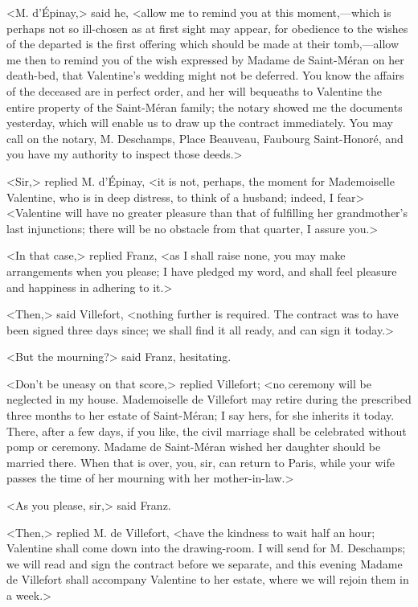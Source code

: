  <M. d'Épinay,> said he, <allow me to remind you at this moment,—which is perhaps not so ill-chosen as at first sight may appear, for obedience to the wishes of the departed is the first offering which should be made at their tomb,—allow me then to remind you of the wish expressed by Madame de Saint-Méran on her death-bed, that Valentine's wedding might not be deferred. You know the affairs of the deceased are in perfect order, and her will bequeaths to Valentine the entire property of the Saint-Méran family; the notary showed me the documents yesterday, which will enable us to draw up the contract immediately. You may call on the notary, M. Deschamps, Place Beauveau, Faubourg Saint-Honoré, and you have my authority to inspect those deeds.> 

 <Sir,> replied M. d'Épinay, <it is not, perhaps, the moment for Mademoiselle Valentine, who is in deep distress, to think of a husband; indeed, I fear\longdash>  <Valentine will have no greater pleasure than that of fulfilling her grandmother's last injunctions; there will be no obstacle from that quarter, I assure you.> 

 <In that case,> replied Franz, <as I shall raise none, you may make arrangements when you please; I have pledged my word, and shall feel pleasure and happiness in adhering to it.> 

 <Then,> said Villefort, <nothing further is required. The contract was to have been signed three days since; we shall find it all ready, and can sign it today.> 

 <But the mourning?> said Franz, hesitating. 

 <Don't be uneasy on that score,> replied Villefort; <no ceremony will be neglected in my house. Mademoiselle de Villefort may retire during the prescribed three months to her estate of Saint-Méran; I say hers, for she inherits it today. There, after a few days, if you like, the civil marriage shall be celebrated without pomp or ceremony. Madame de Saint-Méran wished her daughter should be married there. When that is over, you, sir, can return to Paris, while your wife passes the time of her mourning with her mother-in-law.> 

 <As you please, sir,> said Franz. 

 <Then,> replied M. de Villefort, <have the kindness to wait half an hour; Valentine shall come down into the drawing-room. I will send for M. Deschamps; we will read and sign the contract before we separate, and this evening Madame de Villefort shall accompany Valentine to her estate, where we will rejoin them in a week.> 

